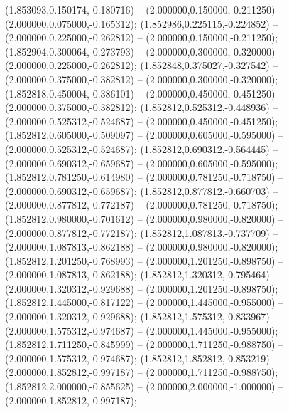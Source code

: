  (1.853093,0.150174,-0.180716) -- (2.000000,0.150000,-0.211250) -- (2.000000,0.075000,-0.165312);
 (1.852986,0.225115,-0.224852) -- (2.000000,0.225000,-0.262812) -- (2.000000,0.150000,-0.211250);
 (1.852904,0.300064,-0.273793) -- (2.000000,0.300000,-0.320000) -- (2.000000,0.225000,-0.262812);
 (1.852848,0.375027,-0.327542) -- (2.000000,0.375000,-0.382812) -- (2.000000,0.300000,-0.320000);
 (1.852818,0.450004,-0.386101) -- (2.000000,0.450000,-0.451250) -- (2.000000,0.375000,-0.382812);
 (1.852812,0.525312,-0.448936) -- (2.000000,0.525312,-0.524687) -- (2.000000,0.450000,-0.451250);
 (1.852812,0.605000,-0.509097) -- (2.000000,0.605000,-0.595000) -- (2.000000,0.525312,-0.524687);
 (1.852812,0.690312,-0.564445) -- (2.000000,0.690312,-0.659687) -- (2.000000,0.605000,-0.595000);
 (1.852812,0.781250,-0.614980) -- (2.000000,0.781250,-0.718750) -- (2.000000,0.690312,-0.659687);
 (1.852812,0.877812,-0.660703) -- (2.000000,0.877812,-0.772187) -- (2.000000,0.781250,-0.718750);
 (1.852812,0.980000,-0.701612) -- (2.000000,0.980000,-0.820000) -- (2.000000,0.877812,-0.772187);
 (1.852812,1.087813,-0.737709) -- (2.000000,1.087813,-0.862188) -- (2.000000,0.980000,-0.820000);
 (1.852812,1.201250,-0.768993) -- (2.000000,1.201250,-0.898750) -- (2.000000,1.087813,-0.862188);
 (1.852812,1.320312,-0.795464) -- (2.000000,1.320312,-0.929688) -- (2.000000,1.201250,-0.898750);
 (1.852812,1.445000,-0.817122) -- (2.000000,1.445000,-0.955000) -- (2.000000,1.320312,-0.929688);
 (1.852812,1.575312,-0.833967) -- (2.000000,1.575312,-0.974687) -- (2.000000,1.445000,-0.955000);
 (1.852812,1.711250,-0.845999) -- (2.000000,1.711250,-0.988750) -- (2.000000,1.575312,-0.974687);
 (1.852812,1.852812,-0.853219) -- (2.000000,1.852812,-0.997187) -- (2.000000,1.711250,-0.988750);
 (1.852812,2.000000,-0.855625) -- (2.000000,2.000000,-1.000000) -- (2.000000,1.852812,-0.997187);
